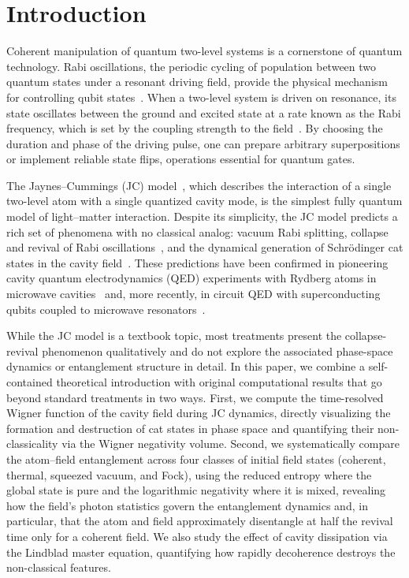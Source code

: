 \documentclass[12pt]{iopart}
\begin{document}
\submitto{\EJP}
\maketitle

\section{Introduction}
\label{sec:intro}

Coherent manipulation of quantum two-level systems is a cornerstone of quantum technology. Rabi oscillations, the periodic cycling of population between two quantum states under a resonant driving field, provide the physical mechanism for controlling qubit states~\cite{rabi1937, scully1997}. When a two-level system is driven on resonance, its state oscillates between the ground and excited state at a rate known as the Rabi frequency, which is set by the coupling strength to the field~\cite{allen1975, gerry2004}. By choosing the duration and phase of the driving pulse, one can prepare arbitrary superpositions or implement reliable state flips, operations essential for quantum gates.

The Jaynes--Cummings (JC) model~\cite{jaynes1963}, which describes the interaction of a single two-level atom with a single quantized cavity mode, is the simplest fully quantum model of light--matter interaction. Despite its simplicity, the JC model predicts a rich set of phenomena with no classical analog: vacuum Rabi splitting, collapse and revival of Rabi oscillations~\cite{eberly1980}, and the dynamical generation of Schr\"{o}dinger cat states in the cavity field~\cite{brune1996}. These predictions have been confirmed in pioneering cavity quantum electrodynamics (QED) experiments with Rydberg atoms in microwave cavities~\cite{rempe1987, haroche2006} and, more recently, in circuit QED with superconducting qubits coupled to microwave resonators~\cite{blais2021}.

While the JC model is a textbook topic, most treatments present the collapse-revival phenomenon qualitatively and do not explore the associated phase-space dynamics or entanglement structure in detail. In this paper, we combine a self-contained theoretical introduction with original computational results that go beyond standard treatments in two ways. First, we compute the time-resolved Wigner function of the cavity field during JC dynamics, directly visualizing the formation and destruction of cat states in phase space and quantifying their non-classicality via the Wigner negativity volume. Second, we systematically compare the atom--field entanglement across four classes of initial field states (coherent, thermal, squeezed vacuum, and Fock), using the reduced entropy where the global state is pure and the logarithmic negativity where it is mixed, revealing how the field's photon statistics govern the entanglement dynamics and, in particular, that the atom and field approximately disentangle at half the revival time only for a coherent field. We also study the effect of cavity dissipation via the Lindblad master equation, quantifying how rapidly decoherence destroys the non-classical features.
\end{document}
